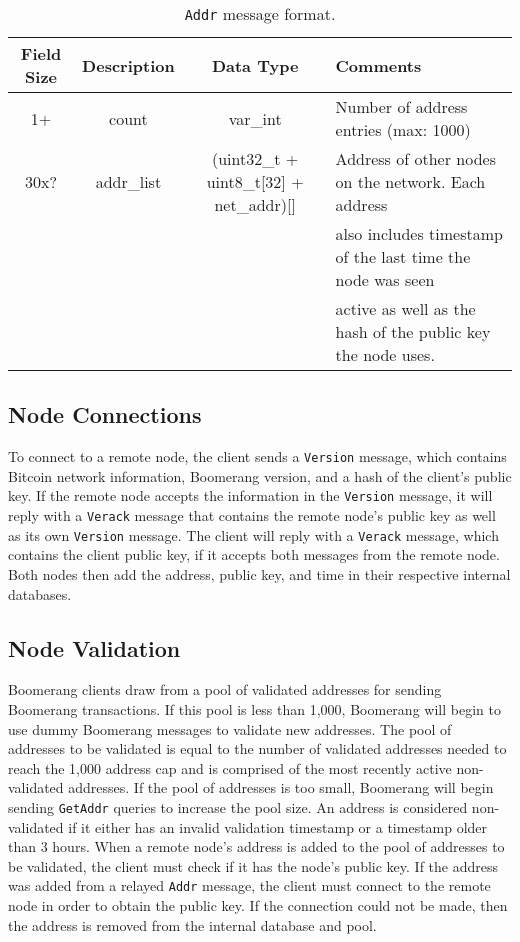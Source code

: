 \begin{table*}[ht!]
\begin{center}
\caption{{\tt Addr} message format.}
\label{tab:msg-addr}
    \begin{tabular}{|c|c|c|l|} \hline
    \textbf{Field Size} & {\bf Description} & {\bf Data Type} & {\bf Comments} \\ \hline
    1+ & count & var\_int & Number of address entries (max: 1000) \\
    30x? & addr\_list & (uint32\_t + uint8\_t[32] + net\_addr)[] & Address of other nodes on the network. Each address \\
    ~ & ~ & ~ & also includes timestamp of the last time the node was seen \\
    ~ & ~ & ~ & active as well as the hash of the public key the node uses. \\ \hline
    \end{tabular} 
\end{center}
\end{table*}

\subsection{Node Connections}
To connect to a remote node, the client sends a {\tt Version} message, which contains Bitcoin network information, Boomerang version, and a hash of the client's public key. If the remote node accepts the information in the {\tt Version} message, it will reply with a {\tt Verack} message that contains the remote node's public key as well as its own {\tt Version} message.  The client will reply with a {\tt Verack} message, which contains the client public key, if it accepts both messages from the remote node.  Both nodes then add the address, public key, and time in their respective internal databases.

\subsection{Node Validation} \label{sec:validation}
Boomerang clients draw from a pool of validated addresses for sending Boomerang transactions. If this pool is less than 1,000, Boomerang will begin to use dummy Boomerang messages to validate new addresses. The pool of addresses to be validated is equal to the number of validated addresses needed to reach the 1,000 address cap and is comprised of the most recently active non-validated addresses. If the pool of addresses is too small, Boomerang will begin sending {\tt GetAddr} queries to increase the pool size. An address is considered non-validated if it either has an invalid validation timestamp or a timestamp older than 3 hours. When a remote node's address is added to the pool of addresses to be validated, the client must check if it has the node's public key. If the address was added from a relayed {\tt Addr} message, the client must connect to the remote node in order to obtain the public key. If the connection could not be made, then the address is removed from the internal database and pool.


